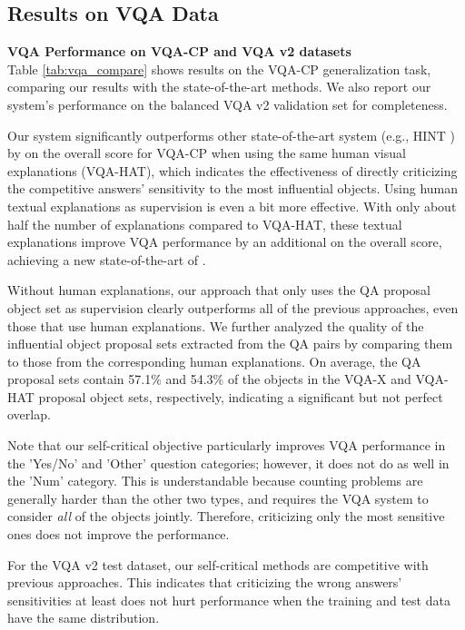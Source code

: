 \documentclass{article}
\begin{document}
\subsection{Results on VQA Data}
\noindent\textbf{VQA Performance on VQA-CP and VQA v2 datasets}\\
Table \ref{tab:vqa_compare} shows results on the VQA-CP generalization task, comparing our results with the state-of-the-art methods. We also report our system's performance on the balanced VQA v2 validation set for completeness.  

Our system significantly outperforms other state-of-the-art system (e.g., HINT \cite{selvaraju2019taking}) by  on the overall score for VQA-CP when using the same human visual explanations (VQA-HAT), which indicates the effectiveness of directly criticizing the competitive answers' sensitivity to the most influential objects. Using human textual explanations as supervision is even a bit more effective. With only about half the number of explanations compared to VQA-HAT, these textual explanations improve VQA performance by an additional  on the overall score, achieving a new state-of-the-art of . 

Without human explanations, our approach that only uses the QA proposal object set as supervision clearly outperforms all of the previous approaches, even those that use human explanations.  We further analyzed the quality of the influential object proposal sets extracted from the QA pairs by comparing them to those from the corresponding human explanations. On average, the QA proposal sets contain  57.1\% and 54.3\%  of the objects in the VQA-X and VQA-HAT proposal object sets, respectively, indicating a significant but not perfect overlap.

Note that our self-critical objective particularly improves VQA performance in the 'Yes/No' and 'Other'  question categories; however, it does not do as well in the 'Num' category. This is understandable because counting problems are generally harder than the other two types, and requires the VQA system to consider {\it all} of the objects jointly. Therefore, criticizing only the most sensitive ones does not improve the performance.

For the VQA v2 test dataset, our self-critical methods are competitive with previous approaches. This indicates that criticizing the wrong answers' sensitivities at least does not hurt performance when the training and test data have the same distribution.
\end{document}
